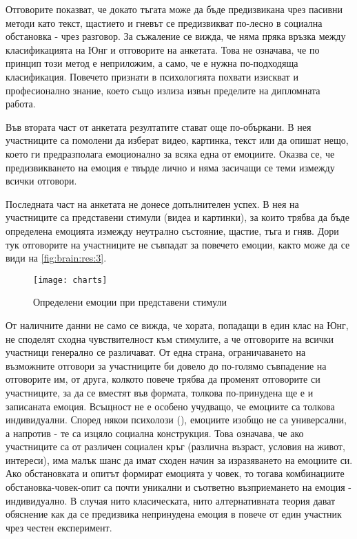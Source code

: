 \documentclass[main.tex]{subfiles}
\begin{document}
Отговорите показват, че докато тъгата може да бъде предизвикана чрез пасивни методи като текст, щастието и гневът се предизвикват по-лесно в социална обстановка - чрез разговор. За съжаление се вижда, че няма пряка връзка между класификацията на Юнг и отговорите на анкетата. Това не означава, че по принцип този метод е неприложим, а само, че е нужна по-подходяща класификация. Повечето признати в психологията похвати изискват и професионално знание, което също излиза извън пределите на дипломната работа.

Във втората част от анкетата резултатите стават още по-объркани. В нея участниците са помолени да изберат видео, картинка, текст или да опишат нещо, което ги предразполага емоционално за всяка една от емоциите. Оказва се, че предизвикването на емоция е твърде лично и няма засичащи се теми измежду всички отговори.

Последната част на анкетата не донесе допълнителен успех. В нея на участниците са представени стимули (видеа и картинки), за които трябва да бъде определена емоцията измежду неутрално състояние, щастие, тъга и гняв. Дори тук отговорите на участниците не съвпадат за повечето емоции, както може да се види на \autoref{fig:brain:res:3}.

\begin{figure}[H]%
    \texttt{[image: charts]}%
\caption{Определени емоции при представени стимули}
\label{fig:brain:res:3}
\end{figure}

От наличните данни не само се вижда, че хората, попадащи в един клас на Юнг, не споделят сходна чувствителност към стимулите, а че отговорите на всички участници генерално се различават. От една страна, ограничаването на възможните отговори за участниците би довело до по-голямо съвпадение на отговорите им, от друга, колкото повече трябва да променят отговорите си участниците, за да се вместят във формата, толкова по-принудена ще е и записаната емоция. Всъщност не е особено учудващо, че емоциите са толкова индивидуални. Според някои психолози (\cite{stupid-book}), емоциите изобщо не са универсални, а напротив - те са изцяло социална конструкция. Това означава, че ако участниците са от различен социален кръг (различна възраст, условия на живот, интереси), има малък шанс да имат сходен начин за изразяването на емоциите си. Ако обстановката и опитът формират емоцията у човек, то тогава комбинациите обстановка-човек-опит са почти уникални и съответно възприемането на емоция - индивидуално. В случая нито класическата, нито алтернативната теория дават обяснение как да се предизвика непринудена емоция в повече от един участник чрез честен експеримент.
\end{document}

